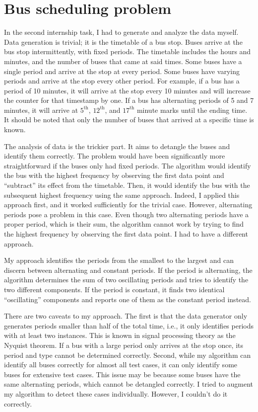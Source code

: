 \documentclass[12pt,a4paper]{article}
\begin{document}
\section{Bus scheduling problem}

In the second internship task, I had to generate and analyze the data myself.
Data generation is trivial; it is the timetable of a bus stop. Buses arrive at
the bus stop intermittently, with fixed periods. The timetable includes the
hours and minutes, and the number of buses that came at said times. Some buses
have a single period and arrive at the stop at every period. Some buses have
varying periods and arrive at the stop every other period. For example, if a bus
has a period of 10 minutes, it will arrive at the stop every 10 minutes and will
increase the counter for that timestamp by one. If a bus has alternating periods
of 5 and 7 minutes, it will arrive at \(5^\text{th}\), \(12^\text{th}\), and
\(17^\text{th}\) minute marks until the ending time. It should be noted that
only the number of buses that arrived at a specific time is known.

The analysis of data is the trickier part. It aims to detangle the buses and
identify them correctly. The problem would have been significantly more
straightforward if the buses only had fixed periods. The algorithm would
identify the bus with the highest frequency by observing the first data point
and ``subtract'' its effect from the timetable. Then, it would identify the bus
with the subsequent highest frequency using the same approach. Indeed, I applied
this approach first, and it worked sufficiently for the trivial case. However,
alternating periods pose a problem in this case. Even though two alternating
periods have a proper period, which is their sum, the algorithm cannot work by
trying to find the highest frequency by observing the first data point. I had to
have a different approach.

My approach identifies the periods from the smallest to the largest and can
discern between alternating and constant periods. If the period is alternating,
the algorithm determines the sum of two oscillating periods and tries to
identify the two different components. If the period is constant, it finds two
identical ``oscillating'' components and reports one of them as the constant
period instead.

There are two caveats to my approach. The first is that the data generator only
generates periods smaller than half of the total time, i.e., it only identifies
periods with at least two instances. This is known in signal processing theory
as the Nyquist theorem. If a bus with a large period only arrives at the stop
once, its period and type cannot be determined correctly. Second, while my
algorithm can identify all buses correctly for almost all test cases, it can
only identify some buses for extensive test cases. This issue may be because
some buses have the same alternating periods, which cannot be detangled
correctly. I tried to augment my algorithm to detect these cases individually.
However, I couldn't do it correctly.
\end{document}
